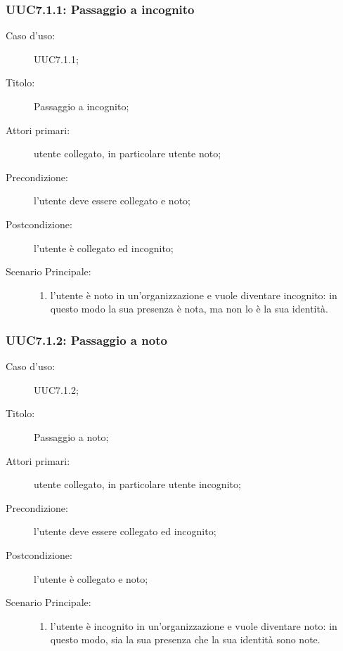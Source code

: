 \documentclass[../../../analisi-dei-requisiti.tex]{subfiles}
\begin{document}
\subsubsection{UUC7.1.1: Passaggio a incognito}%
\label{subs:UUC7.1.1}
\begin{description}
  \item[Caso d’uso:] UUC7.1.1;
  \item[Titolo:] Passaggio a incognito;
  \item[Attori primari:] utente collegato, in particolare utente noto;
  \item[Precondizione:] l'utente deve essere collegato e noto;
  \item[Postcondizione:] l'utente è collegato ed incognito;
  \item[Scenario Principale:]
        \begin{enumerate}
          \item l'utente è noto in un'organizzazione e vuole diventare incognito: in questo modo la sua presenza è nota, ma non lo è la sua identità.
        \end{enumerate}
\end{description}

\subsubsection{UUC7.1.2: Passaggio a noto}%
\label{subs:UUC7.1.2}
\begin{description}
  \item[Caso d’uso:] UUC7.1.2;
  \item[Titolo:] Passaggio a noto;
  \item[Attori primari:] utente collegato, in particolare utente incognito;
  \item[Precondizione:] l'utente deve essere collegato ed incognito;
  \item[Postcondizione:] l'utente è collegato e noto;
  \item[Scenario Principale:]
        \begin{enumerate}
          \item l'utente è incognito in un'organizzazione e vuole diventare noto: in questo modo, sia la sua presenza che la sua identità sono note.
        \end{enumerate}
\end{description}
\end{document}
